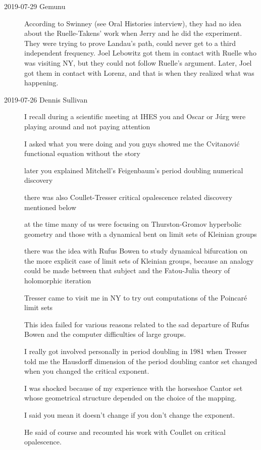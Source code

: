 \begin{description}
\item[2019-07-29 Gemunu]
According to  {Swinney}
(see Oral Histories interview), they had no idea about the Ruelle-Takens'
work when Jerry and he did the experiment. They were trying to prove
Landau's path, could never get to a third independent frequency. Joel
Lebowitz got them in contact with Ruelle who was visiting NY, but they
could not follow Ruelle's argument. Later, Joel got them in contact with
Lorenz, and that is when they realized what was happening.

\item[2019-07-26 Dennis Sullivan] %
I recall during a scientific meeting at IHES you and Oscar or J{\'u}rg
were playing around and not paying attention

I asked what you were doing and you guys showed me the Cvitanovi{\'c} functional
equation without the story

later you explained Mitchell's Feigenbaum's period doubling
numerical discovery

there was also Coullet-Tresser critical opalescence related discovery
mentioned below

at the time  many of us were focusing on Thurston-Gromov hyperbolic
geometry and  those with a dynamical bent on limit sets of Kleinian
groups

there was the idea with Rufus Bowen to study dynamical bifurcation on the
more explicit case of limit sets of Kleinian groups,
because an analogy could be made between that subject and the Fatou-Julia
theory of holomorphic iteration

Tresser came to visit me in NY to try out computations of the Poincar\'e
limit sets

This idea failed for various reasons related to the sad departure of
Rufus Bowen and the computer difficulties of large groups.

I really got involved personally in period doubling in 1981 when Tresser
told me the Hausdorff dimension  of the period doubling cantor set changed
when you changed the critical exponent.

I was shocked because of my experience with the horseshoe Cantor set
whose geometrical structure depended on the choice of the mapping.

I said you mean it doesn't change if you don't change the exponent.

He said of course and recounted his work with Coullet on critical
opalescence.


\end{description}
